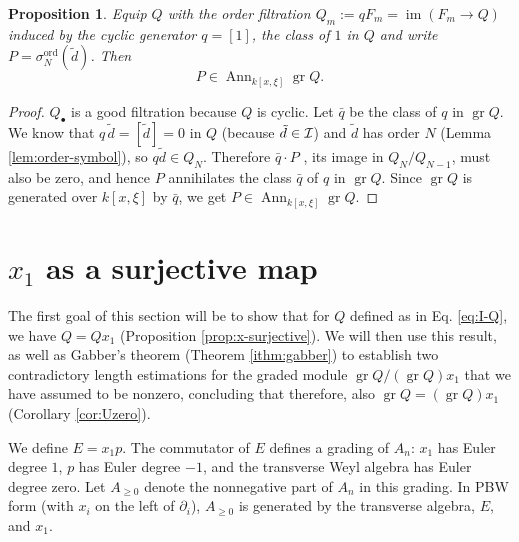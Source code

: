 \documentclass[pdflatex,sn-mathphys-num]{sn-jnl}
\numberwithin{equation}{section}
\theoremstyle{thmstyleone}
\newtheorem{proposition}[theorem]{Proposition}
\theoremstyle{thmstyletwo}
\newcommand{\gr}{\operatorname{gr}}
\newcommand{\Ann}{\operatorname{Ann}}
\begin{document}
\begin{proposition}\label{prop:charP}
Equip $Q$ with the order filtration $Q_m:=qF_m=\operatorname{im}(F_m\to Q)$
induced by the cyclic generator $q = [1]$, the class of $1$ in $Q$ and write $P=\sigma^{\mathrm{ord}}_N(\tilde d)$.  Then
\begin{equation}\label{eq:P-annihilates}
 P\in\Ann_{k[x,\xi]}\gr Q.
\end{equation}
\end{proposition}
\begin{proof}
$Q_\bullet$ is a good filtration because $Q$ is cyclic. Let $\bar q$ be the class of $q$ in $\gr Q$. We know that $q\,\tilde d=[\tilde d]=0$ in $Q$ (because $\tilde d \in \cal I$) and $\tilde d$ has order $N$ (Lemma \ref{lem:order-symbol}), so $q\tilde d \in Q_N$. Therefore $\bar q\cdot P$ , its image in $Q_N/Q_{N-1}$, must also be zero, and hence $P$ annihilates the class $\bar q$ of $q$ in $\gr Q$.
Since $\gr Q$ is generated over $k[x,\xi]$ by $\bar q$, we get $P\in\Ann_{k[x,\xi]}\gr Q$. 
\end{proof}

\section{$x_1$ as a surjective map}\label{sec:euler}
The first goal of this section will be to show that for $Q$ defined as in Eq. \eqref{eq:I-Q}, we have $Q = Qx_1$ (Proposition \ref{prop:x-surjective}). We will then use this result, as well as Gabber's theorem (Theorem \ref{ithm:gabber}) to establish two contradictory length estimations for the graded module $\gr Q/(\gr Q)x_1$ that we have assumed to be nonzero, concluding that therefore, also $\gr Q = (\gr Q)x_1$ (Corollary \ref{cor:Uzero}).\\


We define $E=x_1p$. The commutator of $E$ defines a grading of $A_n$: 
$x_1$ has Euler degree $1$, $p$ has Euler degree $-1$, and the transverse Weyl algebra
has Euler degree zero. Let $A_{\geq0}$ denote the nonnegative part of $A_n$ in this grading. In PBW form (with $x_i$ on the left of $\partial_i$), $A_{\geq0}$ is generated by the transverse algebra, $E$, and $x_1$. 
\end{document}
